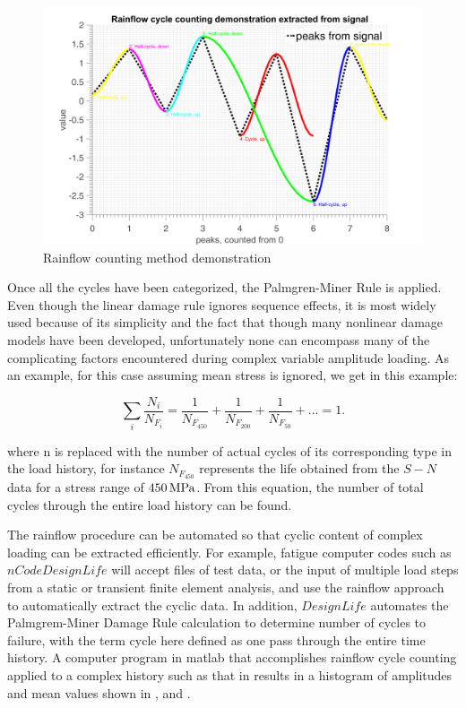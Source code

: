 \begin{figure}[!h]
	\centering
	\includegraphics[width=\textwidth]{figures//rfdemo.png} 
	\caption{Rainflow counting method demonstration}
	\label{rfdemo}
\end{figure}  

Once all the cycles have been categorized, the Palmgren-Miner Rule is applied. Even though the linear damage rule ignores sequence effects, it is most widely used because of its simplicity and the fact that though many nonlinear damage models have been developed, unfortunately none can encompass many of the complicating factors encountered during complex variable amplitude loading. As an example, for this case assuming mean stress is ignored, we get in this example:

$$\sum_i \frac{N_i}{N_{F_i}}=\frac{1}{N_{F_{450}}}+\frac{1}{N_{F_{200}}}+\frac{1}{N_{F_{50}}}+...=1.$$

where n is replaced with the number of actual cycles of its corresponding type in the load history, for instance $N_{F_{450}}$ represents the life obtained from the $S-N$ data for a stress range of $450 \,\textnormal{MPa}$.  From this equation, the number of total cycles through the entire load history can be found.

The rainflow procedure can be automated so that cyclic content of complex loading can be extracted efficiently.  For example, fatigue computer codes such as $nCode DesignLife$ will accept files of test data, or the input of multiple load steps from a static or transient finite element analysis, and use the rainflow approach to automatically extract the cyclic data.  In addition, $DesignLife$ automates the Palmgrem-Miner Damage Rule calculation to determine number of cycles to failure, with the term cycle here defined as one pass through the entire time history. A computer program in matlab that accomplishes rainflow cycle counting applied to a complex history such as that in  results in a histogram of amplitudes and mean values shown in ,  and .

